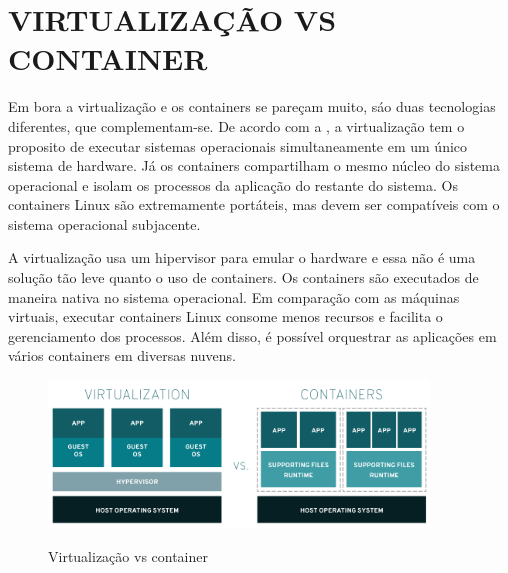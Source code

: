 \section{VIRTUALIZAÇÃO VS CONTAINER}
\label{sec:virtualizaçãos-vs-container}

Em bora a virtualização e os containers se pareçam muito, sáo duas tecnologias diferentes, que complementam-se. De acordo com a , a virtualização tem o proposito de executar sistemas operacionais simultaneamente em um único sistema de hardware. Já os containers compartilham o mesmo núcleo do sistema operacional e isolam os processos da aplicação do restante do sistema. Os containers Linux são extremamente portáteis, mas
devem ser compatíveis com o sistema operacional subjacente.

A virtualização usa um hipervisor para emular o hardware e essa não é uma solução tão leve quanto o uso de containers. Os containers são executados de maneira nativa no sistema operacional. Em comparação com as máquinas virtuais, executar containers Linux consome menos recursos e facilita o gerenciamento dos processos. Além
disso, é possível orquestrar as aplicações em vários containers em diversas nuvens.

\begin{figure}[!htb] 
	\centering
	\caption{Virtualização vs container}
	\includegraphics[width=0.9\textwidth]{figuras/virtualization-vs-containers.png}
	\label{fig:virtualization-vs-containers}
\end{figure}




